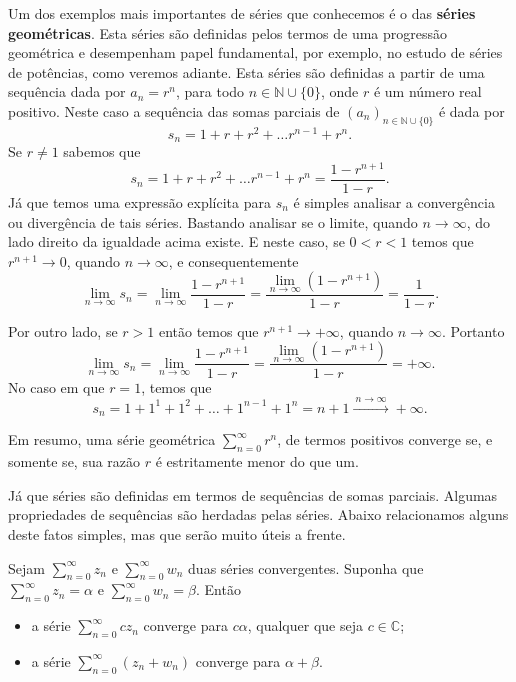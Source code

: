 \bigskip 

Um dos exemplos mais importantes de séries que conhecemos é o das 
\textbf{séries geométricas}.
Esta séries são definidas pelos termos de uma progressão geométrica e desempenham
papel fundamental, por exemplo, no estudo de séries de potências, como veremos adiante.
Esta séries são definidas a partir de uma sequência dada por $a_n = r^n$, 
para todo $n\in\mathbb{N}\cup\{0\}$, onde $r$ é um número real positivo.
Neste caso a sequência das somas parciais de $(a_n)_{n\in\mathbb{N}\cup\{0\}}$
é dada por 
\[
s_n = 1+r+r^2+\ldots r^{n-1}+r^n.
\]
Se $r\neq 1$ sabemos que 
\[
s_n = 1+r+r^2+\ldots r^{n-1}+r^n = \frac{1-r^{n+1}}{1-r}.
\]
Já que temos uma expressão explícita para $s_n$ 
é simples analisar a convergência ou divergência de tais séries. Bastando 
analisar se o limite, quando $n\to\infty$, do lado direito da igualdade acima
existe. E neste caso, se $0<r<1$ temos que $r^{n+1}\to 0$, quando $n\to\infty$,
e consequentemente
\[
\lim_{n\to\infty} s_n
=
\lim_{n\to\infty} \frac{1-r^{n+1}}{1-r}
= 
\frac{\displaystyle\lim_{n\to\infty} (1-r^{n+1})}{1-r} 
=
\frac{1}{1-r}.
\]

Por outro lado, se $r>1$ então temos que $r^{n+1}\to +\infty$, quando $n\to\infty$. 
Portanto
\[
\lim_{n\to\infty} s_n
=
\lim_{n\to\infty} \frac{1-r^{n+1}}{1-r}
= 
\frac{\displaystyle\lim_{n\to\infty} (1-r^{n+1})}{1-r} 
=
+\infty.
\]
No caso em que $r=1$, temos que 
\[
s_n = 1+1^1+1^2+\ldots+1^{n-1}+1^{n}=n+1 \xrightarrow{\ n\to\infty\ } +\infty.
\]


Em resumo, uma série geométrica $\sum_{n=0}^{\infty}r^n$, 
de termos positivos converge se, e somente se,
sua razão $r$ é estritamente menor do que um. 


\bigskip

Já que séries são definidas em termos de sequências de somas parciais. Algumas 
propriedades de sequências são herdadas pelas séries. Abaixo relacionamos alguns
deste fatos simples, mas que serão muito úteis a frente.

\begin{proposicao}
Sejam $\sum_{n=0}^{\infty}z_n$ e $\sum_{n=0}^{\infty}w_n$ duas séries convergentes.
Suponha que $\sum_{n=0}^{\infty}z_n = \alpha$ e $\sum_{n=0}^{\infty} w_n =\beta$.
Então  
\begin{itemize}
	\item a série $\sum_{n=0}^{\infty} cz_n$ converge para $c\alpha$,
	qualquer que seja $c\in\mathbb{C}$;
	
	\item a série $\sum_{n=0}^{\infty}(z_n +w_n)$ converge para $\alpha+\beta$.
\end{itemize}
\end{proposicao}

